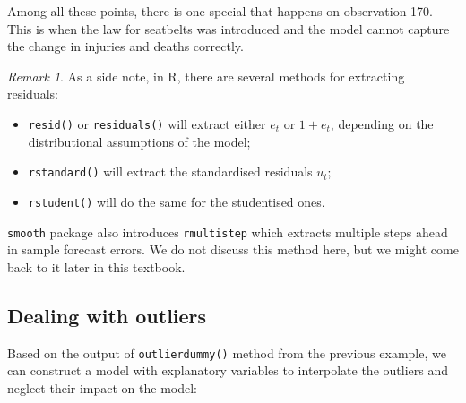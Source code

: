 \documentclass[
]{book}
\newenvironment{Shaded}{\begin{snugshade}}{\end{snugshade}}
\newcommand{\AttributeTok}[1]{\textcolor[rgb]{0.77,0.63,0.00}{#1}}
\newcommand{\DecValTok}[1]{\textcolor[rgb]{0.00,0.00,0.81}{#1}}
\newcommand{\FunctionTok}[1]{\textcolor[rgb]{0.00,0.00,0.00}{#1}}
\newcommand{\NormalTok}[1]{#1}
\newcommand{\OtherTok}[1]{\textcolor[rgb]{0.56,0.35,0.01}{#1}}
\newcommand{\SpecialCharTok}[1]{\textcolor[rgb]{0.00,0.00,0.00}{#1}}
\newcommand{\StringTok}[1]{\textcolor[rgb]{0.31,0.60,0.02}{#1}}
\providecommand{\tightlist}{%
  \setlength{\itemsep}{0pt}\setlength{\parskip}{0pt}}
\theoremstyle{definition}
\theoremstyle{definition}
\theoremstyle{definition}
\theoremstyle{definition}
\theoremstyle{remark}
\newtheorem*{remark}{Remark}
\begin{document}
Among all these points, there is one special that happens on observation 170. This is when the law for seatbelts was introduced and the model cannot capture the change in injuries and deaths correctly.

\begin{remark}

As a side note, in R, there are several methods for extracting residuals:

\begin{itemize}
\tightlist
\item
  \texttt{resid()} or \texttt{residuals()} will extract either \(e_t\) or \(1+e_t\), depending on the distributional assumptions of the model;
\item
  \texttt{rstandard()} will extract the standardised residuals \(u_t\);
\item
  \texttt{rstudent()} will do the same for the studentised ones.
\end{itemize}

\texttt{smooth} package also introduces \texttt{rmultistep} which extracts multiple steps ahead in sample forecast errors. We do not discuss this method here, but we might come back to it later in this textbook.

\end{remark}

\hypertarget{dealing-with-outliers}{%
\subsection{Dealing with outliers}\label{dealing-with-outliers}}

Based on the output of \texttt{outlierdummy()} method from the previous example, we can construct a model with explanatory variables to interpolate the outliers and neglect their impact on the model:

\begin{Shaded}
\end{Shaded}
\end{document}
